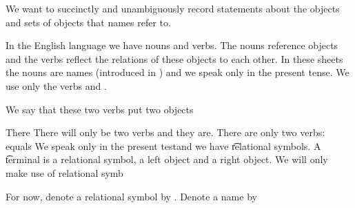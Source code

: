 

We want to succinctly and unambiguously record statements about the objects and sets of objects that names refer to.


In the English language we have nouns and verbs.
The nouns reference objects and the verbs reflect the relations of these objects to each other.
In these sheets the nouns are names (introduced in ) and we speak only in the present tense.
We use only the verbs  and .

We say that these two verbs put two objects

There
There will only be two verbs and they are.
There are only two verbs: equals
We speak only in the present testand we have \t{relational symbols}.
A \t{terminal} is a relational symbol, a left object and a right object.
We will only make use of relational symb

For now, denote a relational symbol by .
Denote a name by 
